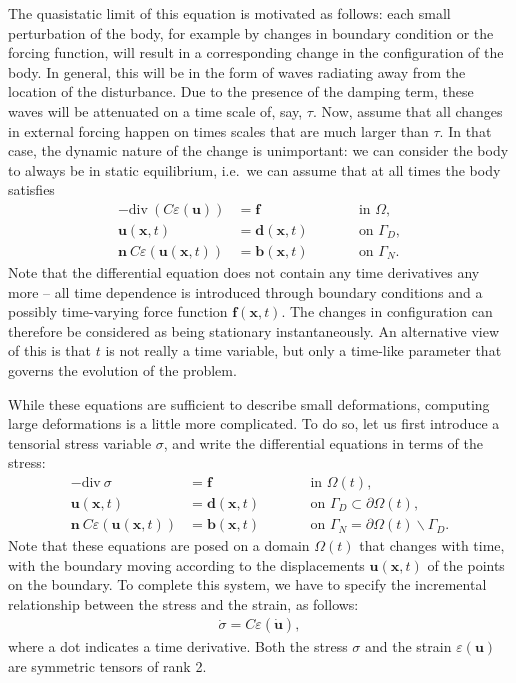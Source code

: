 \documentclass{article}
\renewcommand{\vec}[1]{\mathbf{#1}}
\renewcommand{\div}{\mathrm{div}\ }
\begin{document}
The quasistatic limit of this equation is motivated as follows: each small
perturbation of the body, for example by changes in boundary condition or the
forcing function, will result in a corresponding change in the configuration
of the body. In general, this will be in the form of waves radiating away from
the location of the disturbance. Due to the presence of the damping term,
these waves will be attenuated on a time scale of, say, $\tau$. Now, assume
that all changes in external forcing happen on times scales that are
much larger than $\tau$. In that case, the dynamic nature of the change is
unimportant: we can consider the body to always be in static equilibrium,
i.e.~we can assume that at all times the body satisfies
\begin{align}
  - \div ( C \varepsilon(\vec u)) &= \vec f
  &&\text{in $\Omega$},
  \\
  \vec u(\vec x,t) &= \vec d(\vec x,t)
  \qquad
  &&\text{on $\Gamma_D$},
  \\
  \vec n \ C \varepsilon(\vec u(\vec x,t)) &= \vec b(\vec x,t)
  \qquad
  &&\text{on $\Gamma_N$}.
\end{align}
Note that the differential equation does not contain any time derivatives any
more -- all time dependence is introduced through boundary conditions and a
possibly time-varying force function $\vec f(\vec x,t)$. The changes in
configuration can therefore be considered as being stationary
instantaneously. An alternative view of this is that $t$ is not really a time
variable, but only a time-like parameter that governs the evolution of the
problem.

While these equations are sufficient to describe small deformations, computing
large deformations is a little more complicated. To do so, let us first
introduce a tensorial stress variable $\sigma$, and write the differential
equations in terms of the stress:
\begin{align}
  - \div \sigma &= \vec f
  &&\text{in $\Omega(t)$},
  \\
  \vec u(\vec x,t) &= \vec d(\vec x,t)
  \qquad
  &&\text{on $\Gamma_D\subset\partial\Omega(t)$},
  \\
  \vec n \ C \varepsilon(\vec u(\vec x,t)) &= \vec b(\vec x,t)
  \qquad
  &&\text{on $\Gamma_N=\partial\Omega(t)\backslash\Gamma_D$}.
\end{align}
Note that these equations are posed on a domain $\Omega(t)$ that
changes with time, with the boundary moving according to the
displacements $\vec u(\vec x,t)$ of the points on the boundary. To
complete this system, we have to specify the incremental relationship between
the stress and the strain, as follows:
\begin{align}
  \label{eq:stress-strain}
  \dot\sigma = C \varepsilon (\dot{\vec u}),
\end{align}
where a dot indicates a time derivative. Both the stress $\sigma$ and the
strain $\varepsilon(\vec u)$ are symmetric tensors of rank 2.
\end{document}
